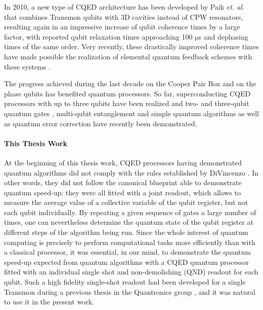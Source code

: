 In 2010, a new type of CQED architecture has been
developed by Paik {\it et. al.} \citep{paik_observation_2011} that combines Transmon
qubits with 3D cavities instead of CPW resonators, resulting again
in an impressive increase of qubit coherence times by a large factor, with reported qubit relaxation times approaching 100 $\mathrm{\mu}$s and dephasing times of the same order.
Very recently, these drastically improved coherence times have made
possible the realization of elemental quantum feedback schemes with these systems \citep{vijay_quantum_2012}.

\smallskip

The progress achieved during the last decade on the
Cooper Pair Box and on the phase qubits has benefited quantum processors.
So far, superconducting CQED processors with up to three qubits have
been realized and two- and three-qubit quantum gates \citep{dicarlo_demonstration_2009,fedorov_implementation_2011},
multi-qubit entanglement \citep{dicarlo_preparation_2010,ansmann_violation_2009} and simple
quantum algorithms \citep{dicarlo_demonstration_2009,mariantoni_implementing_2011} as well as
quantum error correction  \citep{reed_realization_2011} have recently
been demonstrated.

\smallskip

\paragraph{This Thesis Work}

At the beginning of this thesis work, CQED processors
having demonstrated quantum algorithms did not comply with the rules
established by DiVincenzo \citep{divincenzo_physical_2000}. In other words, they
did not follow the canonical blueprint able to demonstrate quantum
speed-up: they were all fitted with a joint readout, which allows
to measure the average value of a collective variable of the qubit
register, but not each qubit individually. By repeating a given sequence
of gates a large number of times, one can nevertheless determine the
quantum state of the qubit register at different steps of the algorithm
being run. Since the whole interest of quantum computing is precisely
to perform computational tasks more efficiently than with a classical
processor, it was essential, in our mind, to demonstrate the quantum
speed-up expected from quantum algorithms with a CQED quantum processor
fitted with an individual single shot and non-demolishing (QND) readout
for each qubit. Such a high fidelity single-shot readout had been
developed for a single Transmon during a previous thesis in the Quantronics
group \citep{mallet_single-shot_2009,palacios-laloy_superconducting_2010}, and it was natural to use it in the present work.

